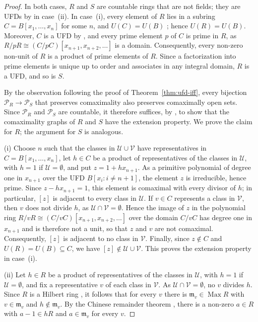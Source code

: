 \documentclass[12pt,reqno,a4paper]{amsart}
\newcommand{\Pe}{\mathcal{P}}
\newcommand{\m}{\mathfrak{m}}
\DeclareMathOperator{\Max}{Max}
\theoremstyle{plain}
\theoremstyle{definition}
\begin{document}
\begin{proof}
In both cases, $R$ and $S$ are countable rings that are not fields; they are UFDs by \cite[Section~9.3, Theorem~7]{DummitFoote} in case~(ii). In case~(i), every element of $R$ lies in a subring $C=B[x_1,\dots,x_n]$ for some $n$, and $U(C)=U(B)$ \cite[Section~9.1, Proposition~1]{DummitFoote}; hence $U(R)=U(B)$. Moreover, $C$ is a UFD by \cite[Section~9.3, Theorem~7]{DummitFoote}, and every prime element $p$ of $C$ is prime in $R$, as $R/pR\cong(C/pC)[x_{n+1},x_{n+2},\dots]$ is a domain. Consequently, every non-zero non-unit of $R$ is a product of prime elements of $R$. Since a factorization into prime elements is unique up to order and associates in any integral domain, $R$ is a UFD, and so is $S$.

By the observation following the proof of Theorem~\ref{thm:ufd-iff}, every bijection $\Pe_R\to\Pe_S$ that preserves comaximality also preserves comaximally open sets. Since $\Pe_R$ and $\Pe_S$ are countable, it therefore suffices, by \cite[Theorem~8.3.1]{Diestel}, to show that the comaximality graphs of $R$ and $S$ have the extension property. We prove the claim for $R$; the argument for $S$ is analogous.

(i) Choose $n$ such that the classes in $\mathcal{U}\cup\mathcal{V}$ have representatives in $C=B[x_1,\dots,x_n]$, let $h\in C$ be a product of representatives of the classes in $\mathcal{U}$, with $h=1$ if $\mathcal{U}=\emptyset$, and put $z=1+hx_{n+1}$. As a primitive polynomial of degree one in $x_{n+1}$ over the UFD $B[x_i:i\neq n+1]$, the element $z$ is irreducible, hence prime. Since $z-hx_{n+1}=1$, this element is comaximal with every divisor of $h$; in particular, $[z]$ is adjacent to every class in $\mathcal{U}$. If $v\in C$ represents a class in $\mathcal{V}$, then $v$ does not divide $h$, as $\mathcal{U}\cap\mathcal{V}=\emptyset$. Hence the image of $z$ in the polynomial ring $R/vR\cong(C/vC)[x_{n+1},x_{n+2},\dots]$ over the domain $C/vC$ has degree one in $x_{n+1}$ and is therefore not a unit, so that $z$ and $v$ are not comaximal. Consequently, $[z]$ is adjacent to no class in $\mathcal{V}$. Finally, since $z\notin C$ and $U(R)=U(B)\subseteq C$, we have $[z]\notin\mathcal{U}\cup\mathcal{V}$. This proves the extension property in case~(i).

(ii) Let $h\in R$ be a product of representatives of the classes in $\mathcal{U}$, with $h=1$ if $\mathcal{U}=\emptyset$, and fix a representative $v$ of each class in $\mathcal{V}$. As $\mathcal{U}\cap\mathcal{V}=\emptyset$, no $v$ divides $h$. Since $R$ is a Hilbert ring \cite[Theorem~4.19]{Eisenbud}, it follows that for every $v$ there is $\m_v\in\Max R$ with $v\in\m_v$ and $h\notin\m_v$. By the Chinese remainder theorem \cite[Proposition~1.10(ii)]{AtiyahMacdonald}, there is a non-zero $a\in R$ with $a-1\in hR$ and $a\in\m_v$ for every $v$. 


\end{proof}
\end{document}

